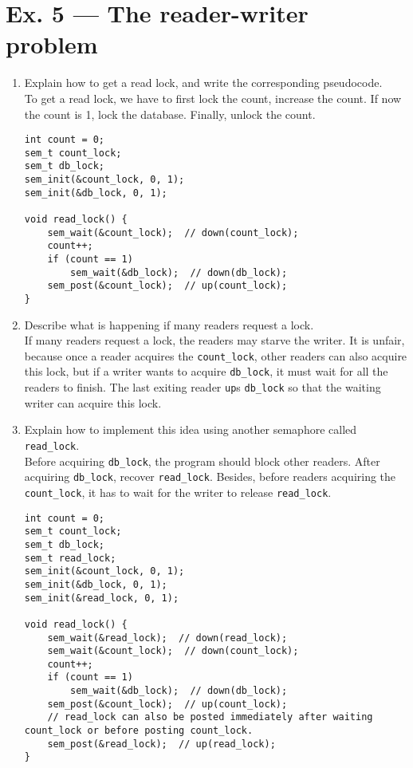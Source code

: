 \documentclass[a4paper]{article}
\begin{document}
\section*{Ex. 5 — The reader-writer problem}
\begin{enumerate}
    \item Explain how to get a read lock, and write the corresponding pseudocode.\\
    To get a read lock, we have to first lock the count, increase the count. If now the count is 1, lock the database. Finally, unlock the count.
    \begin{verbatim}
int count = 0;
sem_t count_lock;
sem_t db_lock;
sem_init(&count_lock, 0, 1);
sem_init(&db_lock, 0, 1);

void read_lock() {
    sem_wait(&count_lock);  // down(count_lock);
    count++;
    if (count == 1)
        sem_wait(&db_lock);  // down(db_lock);
    sem_post(&count_lock);  // up(count_lock);
}
    \end{verbatim}
    \item Describe what is happening if many readers request a lock.\\
    If many readers request a lock, the readers may starve the writer. It is unfair, because once a reader acquires the \texttt{count\_lock}, other readers can also acquire this lock, but if a writer wants to acquire \texttt{db\_lock}, it must wait for all the readers to finish. The last exiting reader \texttt{up}s \texttt{db\_lock} so that the waiting writer can acquire this lock.
    \item Explain how to implement this idea using another semaphore called \texttt{read\_lock}.\\
    Before acquiring \texttt{db\_lock}, the program should block other readers. After acquiring \texttt{db\_lock}, recover \texttt{read\_lock}. Besides, before readers acquiring the \texttt{count\_lock}, it has to wait for the writer to release \texttt{read\_lock}.
    \begin{verbatim}
int count = 0;
sem_t count_lock;
sem_t db_lock;
sem_t read_lock;
sem_init(&count_lock, 0, 1);
sem_init(&db_lock, 0, 1);
sem_init(&read_lock, 0, 1);

void read_lock() {
    sem_wait(&read_lock);  // down(read_lock);
    sem_wait(&count_lock);  // down(count_lock);
    count++;
    if (count == 1)
        sem_wait(&db_lock);  // down(db_lock);
    sem_post(&count_lock);  // up(count_lock);
    // read_lock can also be posted immediately after waiting count_lock or before posting count_lock.
    sem_post(&read_lock);  // up(read_lock);
}


\end{verbatim}
\end{enumerate}
\end{document}
